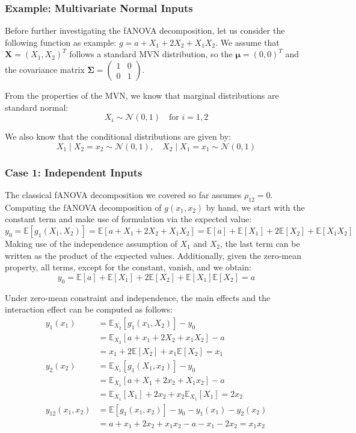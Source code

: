 \subsubsection{Example: Multivariate Normal Inputs}

Before further investigating the fANOVA decomposition, let us consider the following function as example: \(g = a + X_1 + 2X_2 + X_1 X_2\). We assume that $\boldsymbol{X} = (X_1, X_2)^T$ follows a standard MVN distribution, so the $\boldsymbol{\mu} = (0, 0)^T$ and the covariance matrix $\boldsymbol{\Sigma} = \begin{pmatrix} 1 & 0 \\ 0 & 1 \end{pmatrix}$.

From the properties of the MVN, we know that marginal distributions are standard normal:
\[
X_i \sim \mathcal{N}(0, 1) \quad \text{for } i = 1, 2
\]

We also know that the conditional distributions are given by:
\[
X_1 \mid X_2 = x_2 \sim \mathcal{N}(0, 1), \quad
X_2 \mid X_1 = x_1 \sim \mathcal{N}(0, 1)
\]

\subsubsection*{Case 1: Independent Inputs}
The classical fANOVA decomposition we covered so far assumes $\rho_{12} = 0$. Computing the fANOVA decomposition of $g(x_1, x_2)$ by hand, we start with the constant term and make use of formulation via the expected value:
\[
y_0 = \mathbb{E}[g_{1}(X_1, X_2)] = \mathbb{E}[a + X_1 + 2X_2 + X_1X_2] = \mathbb{E}[a] + \mathbb{E}[X_1] + 2\mathbb{E}[X_2] + \mathbb{E}[X_1X_2]
\]
Making use of the independence assumption of $X_1$ and $X_2$, the last term can be written as the product of the expected values. Additionally, given the zero-mean property, all terms, except for the constant, vanish, and we obtain:
\[
y_0 = \mathbb{E}[a] + \mathbb{E}[X_1] + 2\mathbb{E}[X_2] + \mathbb{E}[X_1]\mathbb{E}[X_2] = a
\]

Under zero-mean constraint and independence, the main effects and the interaction effect can be computed as follows:
\begin{align*}
y_1(x_1) &= \mathbb{E}_{X_2}[g_{1}(x_1, X_2)] - y_0 \\
&= \mathbb{E}_{X_2}[a + x_1 + 2X_2 + x_1X_2] - a \\
&= x_1 + 2\mathbb{E}[X_2] + x_1\mathbb{E}[X_2] = x_1\\
y_2(x_2) &= \mathbb{E}_{X_1}[g_{1}(X_1, x_2)] - y_0 \\
&= \mathbb{E}_{X_1}[a + X_1 + 2x_2 + X_1x_2] - a \\
&= \mathbb{E}_{X_1}[X_1] + 2x_2 + x_2\mathbb{E}_{X_1}[X_1] = 2x_2\\
y_{12}(x_1, x_2) &= \mathbb{E}[g_{1}(x_1, x_2)] - y_0 - y_1(x_1) - y_2(x_2) \\
&= a + x_1 + 2x_2 + x_1x_2 - a - x_1 - 2x_2 = x_1x_2
\end{align*}

